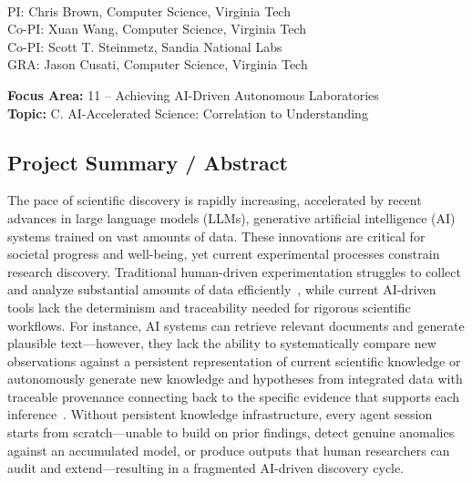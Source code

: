 \documentclass{files/proposalnsf}
\begin{document}
\begin{center}
    \large{\proposalEleven} \\ \vspace{0.5pt}
\footnotesize{PI: Chris Brown, Computer Science, Virginia Tech} \\
\footnotesize{Co-PI: Xuan Wang, Computer Science, Virginia Tech} \\
\footnotesize{Co-PI: Scott T. Steinmetz, Sandia National Labs} \\
\footnotesize{GRA: Jason Cusati, Computer Science, Virginia Tech}
\end{center}

\small{\noindent\textbf{Focus Area:} 11 -- Achieving AI-Driven Autonomous Laboratories} \hfill \\
\small{\textbf{Topic:} C. AI-Accelerated Science: Correlation to Understanding}

\subsection*{Project Summary / Abstract}

The pace of scientific discovery is rapidly increasing, accelerated by recent advances in large language models (LLMs), generative artificial intelligence (AI) systems trained on vast amounts of data. These innovations are critical for societal progress and well-being, yet current experimental processes constrain research discovery. Traditional human-driven experimentation struggles to collect and analyze substantial amounts of data efficiently~\cite{}, while current AI-driven tools lack the determinism and traceability needed for rigorous scientific workflows. For instance, AI systems can retrieve relevant documents and generate plausible text---however, they lack the ability to systematically compare new observations against a persistent representation of current scientific knowledge or autonomously generate new knowledge and hypotheses from integrated data with traceable provenance connecting back to the specific evidence that supports each inference~\cite{Ji2023HallucinationSurvey}. Without persistent knowledge infrastructure, every agent session starts from scratch---unable to build on prior findings, detect genuine anomalies against an accumulated model, or produce outputs that human researchers can audit and extend---resulting in a fragmented AI-driven discovery cycle.
\end{document}
